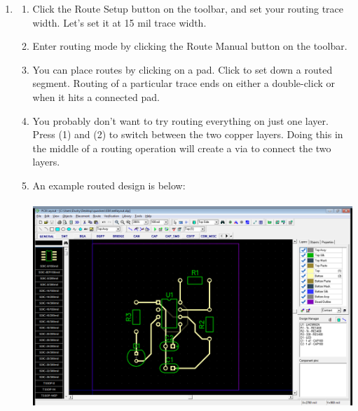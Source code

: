\documentclass[letterpaper]{article}
\newcounter{saveenum}
\newcommand\liststyleRTFNumvi{%
\renewcommand\theenumi{\arabic{enumi}}
\renewcommand\theenumii{\alph{enumii}}
\renewcommand\theenumiii{\roman{enumiii}}
\renewcommand\theenumiv{\arabic{enumiv}}
\renewcommand\labelenumi{\theenumi.}
\renewcommand\labelenumii{\theenumii.}
\renewcommand\labelenumiii{\theenumiii.}
\renewcommand\labelenumiv{\theenumiv.}
}
\begin{document}
\liststyleRTFNumvi
\setcounter{saveenum}{\value{enumi}}
\begin{enumerate}
\setcounter{enumi}{\value{saveenum}}
\item \setcounter{saveenum}{\value{enumii}}
\begin{enumerate}
\setcounter{enumii}{\value{saveenum}}
\item {\sffamily\color[rgb]{0.30980393,0.5058824,0.7411765}
Click the {\textquotedbl}Route Setup{\textquotedbl} button on the toolbar, and set your routing trace width. Let's set
it at 15 mil trace width.}
\item {\sffamily\color[rgb]{0.30980393,0.5058824,0.7411765}
Enter routing mode by clicking the {\textquotedbl}Route Manual{\textquotedbl} button on the toolbar.}
\item {\sffamily\color[rgb]{0.30980393,0.5058824,0.7411765}
You can place routes by clicking on a pad. Click to set down a routed segment. Routing of a particular trace ends on
either a double-click or when it hits a connected pad.}
\item {\sffamily\color[rgb]{0.30980393,0.5058824,0.7411765}
You probably don't want to try routing everything on just one layer. Press (1) and (2) to switch between the two copper
layers. Doing this in the middle of a routing operation will create a via to connect the two layers.}
\item {\sffamily\color[rgb]{0.30980393,0.5058824,0.7411765}
An example routed design is below:\newline
 \includegraphics[width=5.4in,height=3.3665in]{figures/ee4document-img026.png} }
\end{enumerate}
\end{enumerate}
\end{document}
